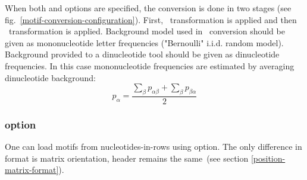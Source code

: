 


When both  and  options are specified, the conversion is done in two stages (see fig.~\ref{motif-conversion-configuration}). First, \PcmToPwm\ transformation is applied and then \PwmToDiPwm\ transformation is applied. 
Background model used in \PcmToPwm\ conversion should be given as mononucleotide letter frequencies ("Bernoulli" i.i.d. random model). Background provided to a dinucleotide tool should be given as dinucleotide frequencies. In this case mononucleotide frequencies are estimated by averaging dinucleotide background:
\begin{equation}p_{\alpha} = \frac{\sum_{\beta}p_{\alpha\beta} + \sum_{\beta}p_{\beta\alpha}}{2}\end{equation}


\subsubsection{ option}\label{TransposeOption}
One can load motifs from nucleotides-in-rows using  option. The only difference in format is matrix orientation, header remains the same~(see section \ref{position-matrix-format}).
